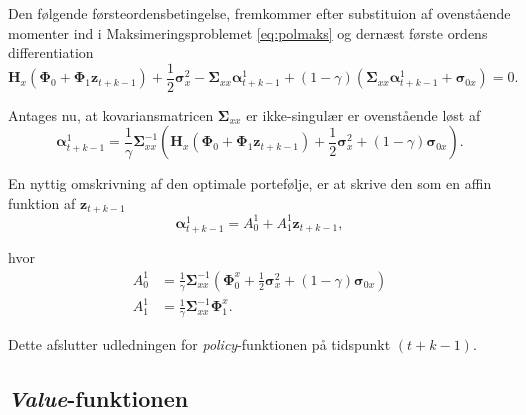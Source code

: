 \documentclass[
  a4paper,
  oneside]{memoir}
\begin{document}
Den følgende førsteordensbetingelse, fremkommer efter substituion af ovenstående momenter ind i Maksimeringsproblemet \eqref{eq:polmaks} og dernæst første ordens differentiation
\[\bm{H}_x\left(\bm{\Phi}_0 +\bm{\Phi}_1\bm{z}_{t+k-1}\right)+\frac{1}{2}\bm{\sigma}_x^2 - \bm{\Sigma}_{xx} \bm{\alpha}_{t+k-1}^{1}+\left(1-\gamma\right) \left(\bm{\Sigma}_{xx}\bm{\alpha}_{t+k-1}^{1}+\bm{\sigma}_{0x}\right)=0.\]

Antages nu, at kovariansmatricen \(\bm{\Sigma}_{xx}\) er ikke-singulær er ovenstående løst af
\[\bm{\alpha}_{t+k-1}^{1}=\frac{1}{\gamma}\bm{\Sigma}_{xx}^{-1}\left(\bm{H}_x(\bm{\Phi}_0 +\bm{\Phi}_1\bm{z}_{t+k-1})+\frac{1}{2}\bm{\sigma}_x^2+(1-\gamma) \bm{\sigma}_{0x}\right).\]

En nyttig omskrivning af den optimale portefølje, er at skrive den som en affin funktion af \(\bm{z}_{t+k-1}\)
\begin{equation}
\bm{\alpha}_{t+k-1}^{1} = A_0^1 + A_1^1\bm{z}_{t+k-1}, \label{eq:pol1p}
\end{equation}

hvor
\begin{align*}
A_0^1&=\frac{1}{\gamma} \bm{\Sigma}_{xx}^{-1}\left(\bm{\Phi}_0^x + \frac{1}{2}\bm{\sigma}_x^2+(1-\gamma)  \bm{\sigma}_{0x}\right)\\
A_1^1&=\frac{1}{\gamma} \bm{\Sigma}_{xx}^{-1}\bm{\Phi}_1^x.
\end{align*}

Dette afslutter udledningen for \emph{policy}-funktionen på tidspunkt \((t+k-1)\).

\hypertarget{value-funktionen}{%
\subsection{\texorpdfstring{\emph{Value}-funktionen}{Value-funktionen}}\label{value-funktionen}}
\end{document}
